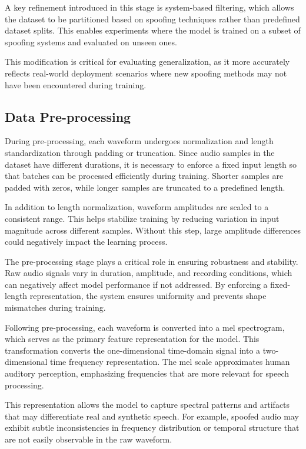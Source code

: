 \documentclass[conference]{IEEEtran}
\begin{document}
A key refinement introduced in this stage is system-based
filtering, which allows the dataset to be partitioned based on
spoofing techniques rather than predefined dataset splits. This
enables experiments where the model is trained on a subset of
spoofing systems and evaluated on unseen ones.

This modification is critical for evaluating generalization,
as it more accurately reflects real-world deployment scenarios
where new spoofing methods may not have been encountered
during training.

\subsection{Data Pre-processing}

During pre-processing, each waveform undergoes normalization
and length standardization through padding or truncation.
Since audio samples in the dataset have different durations,
it is necessary to enforce a fixed input length so that batches can be processed efficiently during training. Shorter samples
are padded with zeros, while longer samples are truncated to
a predefined length.

In addition to length normalization, waveform amplitudes
are scaled to a consistent range. This helps stabilize training by
reducing variation in input magnitude across different samples.
Without this step, large amplitude differences could negatively
impact the learning process.

The pre-processing stage plays a critical role in ensuring
robustness and stability. Raw audio signals vary in duration,
amplitude, and recording conditions, which can negatively
affect model performance if not addressed. By enforcing a
fixed-length representation, the system ensures uniformity and
prevents shape mismatches during training.

Following pre-processing, each waveform is converted into a
mel spectrogram, which serves as the primary feature representation
for the model. This transformation converts the one-dimensional
time-domain signal into a two-dimensional time frequency
representation. The mel scale approximates human
auditory perception, emphasizing frequencies that are more
relevant for speech processing.

This representation allows the model to capture spectral
patterns and artifacts that may differentiate real and synthetic
speech. For example, spoofed audio may exhibit subtle inconsistencies
in frequency distribution or temporal structure that
are not easily observable in the raw waveform.
\end{document}
